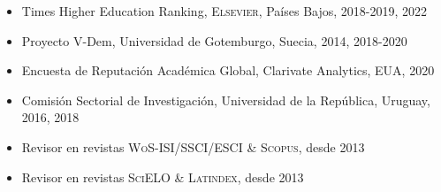 





\begin{publications}

\begin{itemize}
\item{\small Times Higher Education Ranking, {\scshape Elsevier}, Países Bajos, 2018-2019, 2022}
\item{\small Proyecto V-Dem, Universidad de Gotemburgo, Suecia, 2014, 2018-2020}
\item{\small Encuesta de Reputación Académica Global, Clarivate Analytics, EUA, 2020}
\item{\small Comisión Sectorial de Investigación, Universidad de la Rep\'ublica, Uruguay, 2016, 2018}
\item{\small Revisor en revistas {\scshape WoS-ISI/SSCI/ESCI} \& {\scshape Scopus}, desde 2013}
\item{\small Revisor en revistas {\scshape SciELO} \& {\scshape Latindex}, desde 2013}
\end{itemize}

\pagebreak
\end{publications}
